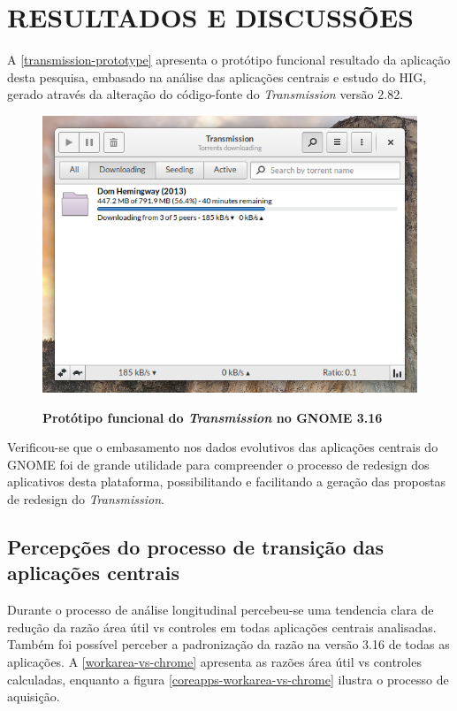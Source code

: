 \chapter{RESULTADOS E DISCUSSÕES}

A \autoref{transmission-prototype} apresenta o protótipo funcional
resultado da aplicação desta pesquisa, embasado na análise das aplicações
centrais e estudo do HIG, gerado através da alteração do código-fonte do
\textit{Transmission} versão 2.82.

\begin{figure}[!ht]
  \begin{center}
    \caption{\textbf{Protótipo funcional do \textit{Transmission} no GNOME 3.16}}
    \includegraphics[width=\textwidth]{image/transmission-gtk3-main.png}
    \label{transmission-prototype}
  \end{center}
\end{figure}

Verificou-se que o embasamento nos dados evolutivos das aplicações centrais do
GNOME foi de grande utilidade para compreender o processo de redesign dos
aplicativos desta plataforma, possibilitando e facilitando a geração das
propostas de redesign do \textit{Transmission}.

\section{Percepções do processo de transição das aplicações centrais}

Durante o processo de análise longitudinal percebeu-se uma tendencia clara de
redução da razão área útil vs controles em todas aplicações centrais analisadas.
Também foi possível perceber a padronização da razão na versão 3.16 de todas as
aplicações. A \autoref{workarea-vs-chrome} apresenta as razões área útil vs
controles calculadas, enquanto a figura \autoref{coreapps-workarea-vs-chrome}
ilustra o processo de aquisição.

